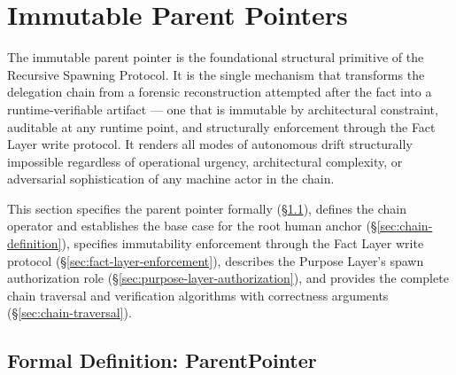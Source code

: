 \section{Immutable Parent Pointers}
\label{sec:immutable-parent-pointers}

The immutable parent pointer is the foundational structural primitive of the Recursive Spawning Protocol. It is the single mechanism that transforms the delegation chain from a forensic reconstruction attempted after the fact into a runtime-verifiable artifact — one that is immutable by architectural constraint, auditable at any runtime point, and structurally enforcement through the Fact Layer write protocol. It renders all modes of autonomous drift structurally impossible regardless of operational urgency, architectural complexity, or adversarial sophistication of any machine actor in the chain.

This section specifies the parent pointer formally (\S\ref{sec:parent-pointer-formal}), defines the chain operator and establishes the base case for the root human anchor (\S\ref{sec:chain-definition}), specifies immutability enforcement through the Fact Layer write protocol (\S\ref{sec:fact-layer-enforcement}), describes the Purpose Layer's spawn authorization role (\S\ref{sec:purpose-layer-authorization}), and provides the complete chain traversal and verification algorithms with correctness arguments (\S\ref{sec:chain-traversal}).

\subsection{Formal Definition: ParentPointer}
\label{sec:parent-pointer-formal}

